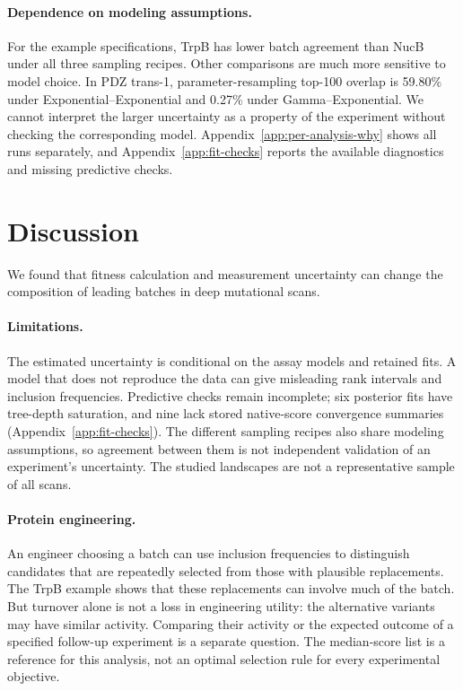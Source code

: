 \documentclass[11pt]{article}
\begin{document}
\paragraph{Dependence on modeling assumptions.}
\label{sec:sensitivity}

For the example specifications, TrpB has lower batch agreement than NucB
under all three sampling recipes. Other comparisons are much more sensitive
to model choice. In PDZ trans-1, parameter-resampling top-100 overlap is
59.80\% under Exponential--Exponential and 0.27\% under Gamma--Exponential.
We cannot interpret the larger uncertainty as a property of the experiment
without checking the corresponding model. Appendix~\ref{app:per-analysis-why}
shows all runs separately, and Appendix~\ref{app:fit-checks} reports the
available diagnostics and missing predictive checks.

\section{Discussion}
\label{sec:discussion}

We found that fitness calculation and measurement uncertainty can change
the composition of leading batches in deep mutational scans.

\paragraph{Limitations.}
The estimated uncertainty is conditional on the assay models and retained
fits. A model that does not reproduce the data can give misleading rank
intervals and inclusion frequencies. Predictive checks remain incomplete;
six posterior fits have tree-depth saturation, and nine lack stored
native-score convergence summaries (Appendix~\ref{app:fit-checks}). The
different sampling recipes also share modeling assumptions, so agreement
between them is not independent validation of an experiment's uncertainty.
The studied landscapes are not a representative sample of all scans.

\paragraph{Protein engineering.}
An engineer choosing a batch can use inclusion frequencies to distinguish
candidates that are repeatedly selected from those with plausible replacements.
The TrpB example shows that these replacements can involve much of the
batch. But turnover alone is not a loss in engineering utility: the
alternative variants may have similar activity. Comparing their activity
or the expected outcome of a specified follow-up experiment is a separate
question. The median-score list is a reference for this analysis, not an
optimal selection rule for every experimental objective.
\end{document}
